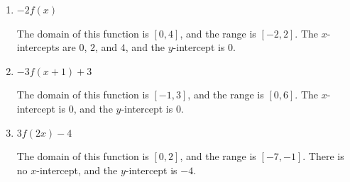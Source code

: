 \documentclass{article}
\begin{document}
\begin{enumerate}
\begin{enumerate}[resume]
    \item
      \begin{problem}[1.5in]
        $-2 f(x)$
      \end{problem}

      \begin{solution}
          The domain of this function is $[0, 4]$, and the range is $[-2,2]$. The
          $x$-intercepts are $0$, $2$, and $4$, and the $y$-intercept is $0$. 

      \end{solution}

    \item
      \begin{problem}[1.5in]
        $-3 f(x + 1) + 3$
      \end{problem}

      \begin{solution}
          The domain of this function is $[-1, 3]$, and the range is $[0,6]$. The
          $x$-intercept is $0$, and the $y$-intercept is $0$. 

      \end{solution}

    \item
      \begin{problem}[1.5in]
        $3 f(2x) - 4$
      \end{problem}

      \begin{solution}
          The domain of this function is $[0, 2]$, and the range is $[-7,-1]$. There is no
          $x$-intercept, and the $y$-intercept is $-4$.

      \end{solution}


\end{enumerate}
\end{enumerate}
\end{document}

